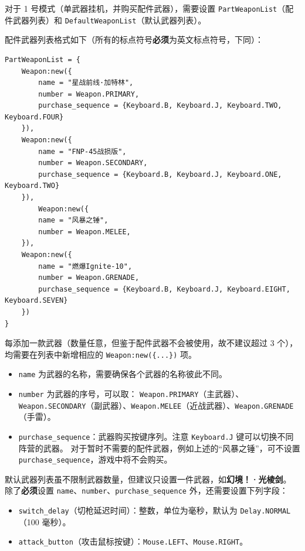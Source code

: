 对于 1 号模式（单武器挂机，并购买配件武器），需要设置 \lstinline{PartWeaponList}（配件武器列表）和 \lstinline{DefaultWeaponList}（默认武器列表）。

配件武器列表格式如下（所有的标点符号\textbf{必须}为英文标点符号，下同）：

\begin{verbatim}
PartWeaponList = {
    Weapon:new({
        name = "星战前线·加特林",
        number = Weapon.PRIMARY,
        purchase_sequence = {Keyboard.B, Keyboard.J, Keyboard.TWO, Keyboard.FOUR}
    }),
    Weapon:new({
        name = "FNP-45战损版",
        number = Weapon.SECONDARY,
        purchase_sequence = {Keyboard.B, Keyboard.J, Keyboard.ONE, Keyboard.TWO}
    }),
        Weapon:new({
        name = "风暴之锤",
        number = Weapon.MELEE,
    }),
    Weapon:new({
        name = "燃爆Ignite-10",
        number = Weapon.GRENADE,
        purchase_sequence = {Keyboard.B, Keyboard.J, Keyboard.EIGHT, Keyboard.SEVEN}
    })
}
\end{verbatim}

每添加一款武器（数量任意，但鉴于配件武器不会被使用，故不建议超过 3 个），均需要在列表中新增相应的 \lstinline|Weapon:new({...})| 项。
\begin{itemize}

\item \lstinline{name} 为武器的名称，需要确保各个武器的名称彼此不同。

\item \lstinline{number} 为武器的序号，可以取：
\lstinline{Weapon.PRIMARY}（主武器）、\lstinline{Weapon.SECONDARY}（副武器）、\lstinline{Weapon.MELEE}（近战武器）、\lstinline{Weapon.GRENADE}（手雷）。

\item \lstinline{purchase_sequence}：武器购买按键序列。注意 \lstinline{Keyboard.J} 键可以切换不同阵营的武器。
对于暂时不需要的配件武器，例如上述的“风暴之锤”，可不设置 \lstinline{purchase_sequence}，游戏中将不会购买。

\end{itemize}

默认武器列表虽不限制武器数量，但建议只设置一件武器，如\textbf{幻境！·光棱剑}。
除了\textbf{必须}设置 \lstinline{name}、\lstinline{number}、\lstinline{purchase_sequence} 外，还需要设置下列字段：

\begin{itemize}

\item \lstinline{switch_delay}（切枪延迟时间）：整数，单位为毫秒，默认为 \lstinline{Delay.NORMAL}（100 毫秒）。

\item \lstinline{attack_button}（攻击鼠标按键）：\lstinline{Mouse.LEFT}、\lstinline{Mouse.RIGHT}。

\end{itemize}

